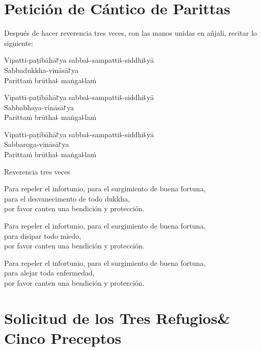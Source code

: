 \clearpage
\chapter{Petición de Cántico de Parittas}

\begin{instruction}
  Después de hacer reverencia tres veces, con las manos unidas en añjali, recitar lo siguiente:
\end{instruction}

Vipatti-paṭibāhā꜓ya sabba꜕-sampatti꜕-siddhi꜕yā\\
Sabbadukkha-vināsā꜓ya\\
Parittaṁ brūtha꜕ maṅga꜕laṁ

Vipatti-paṭibāhā꜓ya sabba꜕-sampatti꜕-siddhi꜕yā\\
Sabbabhaya-vināsā꜓ya\\
Parittaṁ brūtha꜕ maṅga꜕laṁ

Vipatti-paṭibāhā꜓ya sabba꜕-sampatti꜕-siddhi꜕yā\\
Sabbaroga-vināsā꜓ya\\
Parittaṁ brūtha꜕ maṅga꜕laṁ

\begin{instruction}
  Reverencia tres veces
\end{instruction}

\begin{english}
Para repeler el infortunio, para el surgimiento de buena fortuna,\\
para el desvanecimento de todo dukkha,\\
por favor canten una bendición y protección.

Para repeler el infortunio, para el surgimiento de buena fortuna,\\
para disipar todo miedo,\\
por favor canten una bendición y protección.

Para repeler el infortunio, para el surgimiento de buena fortuna,\\
para alejar toda enfermedad,\\
por favor canten una bendición y protección.
\end{english}

\setlength{\englishIndent}{\leaderIndent}

\clearpage
\chapter[Tres Refugios \& Cinco Preceptos]{Solicitud de los Tres Refugios\newline \& Cinco Preceptos}

